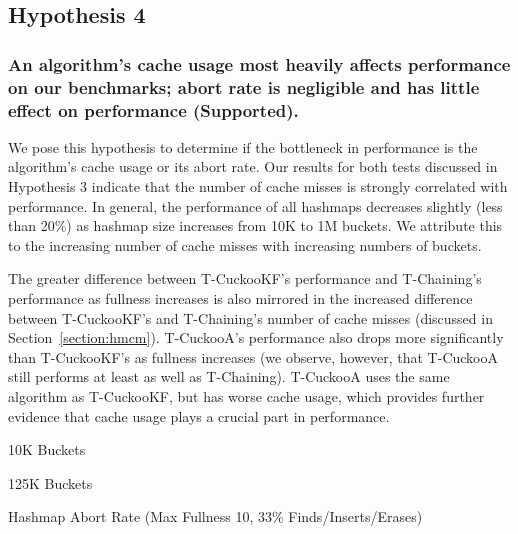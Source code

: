 \vspace{12pt}
\noindent{}


\subsection{Hypothesis 4}
\subsubsection{An algorithm's cache usage most heavily affects performance on our benchmarks; abort rate is negligible and has little effect on performance (Supported).}

    We pose this hypothesis to determine if the bottleneck in performance is the algorithm's cache usage or its abort rate. 
Our results for both tests discussed in Hypothesis 3 indicate that the number of cache misses is strongly correlated with performance. In general, the performance of all hashmaps decreases slightly (less than 20\%) as hashmap size increases from 10K to 1M buckets. We attribute this to the increasing number of cache misses with increasing numbers of buckets.

The greater difference between T-CuckooKF's performance and T-Chaining's performance as fullness increases is also mirrored in the increased difference between T-CuckooKF's and T-Chaining's number of cache misses (discussed in Section~\ref{section:hmcm}). T-CuckooA's performance also drops more significantly than T-CuckooKF's as fullness increases (we observe, however, that T-CuckooA still performs at least as well as T-Chaining). T-CuckooA uses the same algorithm as T-CuckooKF, but has worse cache usage, which provides further evidence that cache usage plays a crucial part in performance. 

    \begin{table}[t]
    \centering
	\singlespace
        \begin{minipage}{\textwidth}
            \centering
        
        \caption*{10K Buckets}
            \vspace{12pt}
        \end{minipage}
        \begin{minipage}{\textwidth}
            \centering
        
        \caption*{125K Buckets}
        \end{minipage}
        \caption{Hashmap Abort Rate (Max Fullness 10, 33\% Finds/Inserts/Erases)}
		\label{tab:hm_aborts}
    \end{table}

